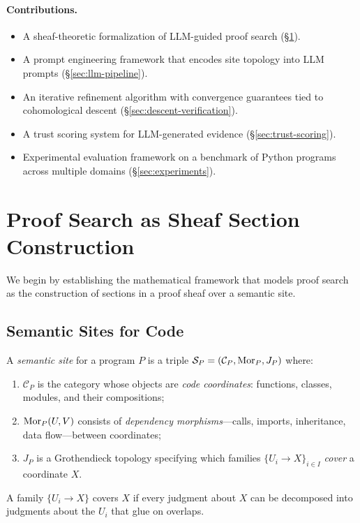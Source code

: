 \documentclass[11pt]{article}
\begin{document}
\paragraph{Contributions.}
\begin{itemize}
  \item A sheaf-theoretic formalization of LLM-guided proof search
    (\S\ref{sec:proof-sheaves}).
  \item A prompt engineering framework that encodes site topology into
    LLM prompts (\S\ref{sec:llm-pipeline}).
  \item An iterative refinement algorithm with convergence guarantees
    tied to cohomological descent (\S\ref{sec:descent-verification}).
  \item A trust scoring system for LLM-generated evidence
    (\S\ref{sec:trust-scoring}).
  \item Experimental evaluation framework on a benchmark of Python programs
    across multiple domains (\S\ref{sec:experiments}).
\end{itemize}


\section{Proof Search as Sheaf Section Construction}\label{sec:proof-sheaves}

We begin by establishing the mathematical framework that models proof
search as the construction of sections in a proof sheaf over a
semantic site.

\subsection{Semantic Sites for Code}\label{subsec:sites}

\begin{definition}\label{def:semantic-site}
A \emph{semantic site} for a program $P$ is a triple
$\mathcal{S}_P = (\mathcal{C}_P, \mathrm{Mor}_P, J_P)$ where:
\begin{enumerate}[label=(\alph*)]
  \item $\mathcal{C}_P$ is the category whose objects are
    \emph{code coordinates}: functions, classes, modules, and their
    compositions;
  \item $\mathrm{Mor}_P(U, V)$ consists of \emph{dependency morphisms}---calls,
    imports, inheritance, data flow---between coordinates;
  \item $J_P$ is a Grothendieck topology specifying which families
    $\{U_i \to X\}_{i \in I}$ \emph{cover} a coordinate $X$.
\end{enumerate}
A family $\{U_i \to X\}$ covers $X$ if every judgment about $X$ can
be decomposed into judgments about the $U_i$ that glue on overlaps.
\end{definition}
\end{document}

